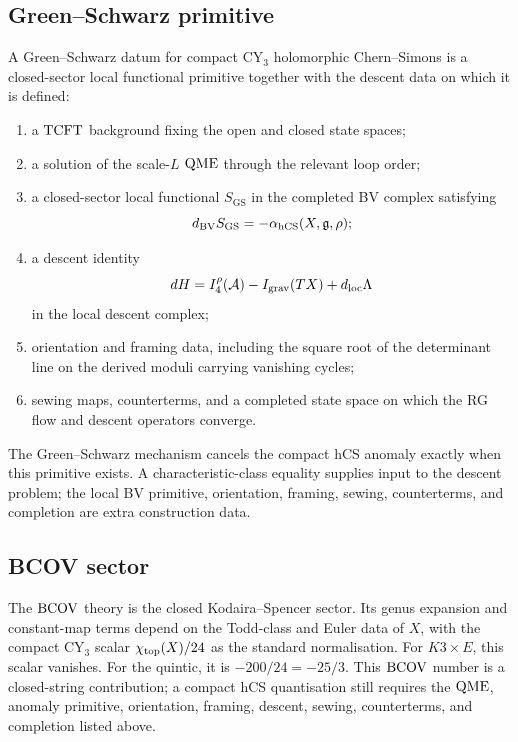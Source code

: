 \subsection{Green--Schwarz primitive}

A Green--Schwarz datum for compact CY$_3$ holomorphic Chern--Simons is
a closed-sector local functional primitive together with the descent
data on which it is defined:
\begin{enumerate}
\item a \(\mathrm{TCFT}\) background fixing the open and closed state spaces;
\item a solution of the scale-\(L\) \(\mathrm{QME}\) through the relevant loop
  order;
\item a closed-sector local functional \(S_{\mathrm{GS}}\) in the
  completed BV complex satisfying
  \[
    d_{\mathrm{BV}}S_{\mathrm{GS}}
    =
    -\alpha_{\mathrm{hCS}}(X,\mathfrak{g},\rho);
  \]
\item a descent identity
  \[
    dH =
    I_4^\rho(\mathcal{A})-I_{\mathrm{grav}}(TX)+d_{\mathrm{loc}}\Lambda
  \]
  in the local descent complex;
\item orientation and framing data, including the square root of the
  determinant line on the derived moduli carrying vanishing cycles;
\item sewing maps, counterterms, and a completed state space on which
  the RG flow and descent operators converge.
\end{enumerate}
The Green--Schwarz mechanism cancels the compact hCS anomaly exactly
when this primitive exists.  A characteristic-class equality supplies
input to the descent problem; the local BV primitive, orientation,
framing, sewing, counterterms, and completion are extra construction
data.

\subsection{BCOV sector}

The \(\mathrm{BCOV}\) theory is the closed Kodaira--Spencer sector.  Its genus
expansion and constant-map terms depend on the Todd-class and Euler
data of \(X\), with the compact CY$_3$ scalar \(\chi_{\mathrm{top}}(X)/24\) as the
standard normalisation.  For \(K3\times E\), this scalar vanishes.  For
the quintic, it is \(-200/24=-25/3\).  This \(\mathrm{BCOV}\) number is a
closed-string contribution; a compact hCS quantisation still requires
the \(\mathrm{QME}\), anomaly primitive, orientation, framing, descent,
sewing, counterterms, and completion listed above.

